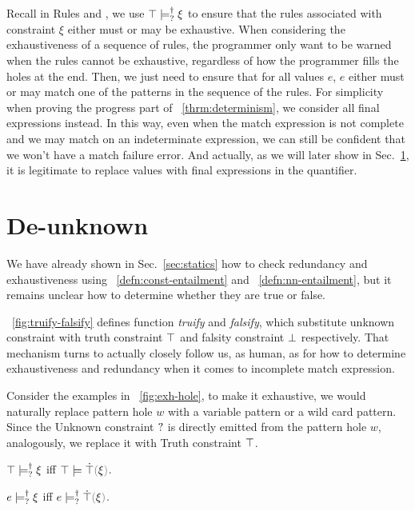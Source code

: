 \documentclass[runningheads,envcountsame,a4paper]{llncs}
\begin{document}
Recall in Rules \TMatchZPre and \TMatchNZPre, we use $\top \models_{?}^{\dag} \xi$ to ensure that the rules associated with constraint $\xi$ either must or may be exhaustive. When considering the exhaustiveness of a sequence of rules, the programmer only want to be warned when the rules cannot be exhaustive, regardless of how the programmer fills the holes at the end. Then, we just need to ensure that for all values $e$, $e$ either must or may match one of the patterns in the sequence of the rules. For simplicity when proving the progress part of  \theoremname~\ref{thrm:determinism}, we consider all final expressions instead. In this way, even when the match expression is not complete and we may match on an indeterminate expression, we can still be confident that we won't have a match failure error. And actually, as we will later show in Sec.~\ref{sec:algorithm}, it is legitimate to replace values with final expressions in the quantifier.

\section{De-unknown}\label{sec:algorithm}

We have already shown in Sec.~\ref{sec:statics} how to check redundancy and
exhaustiveness using ~\ref{defn:const-entailment} and
~\ref{defn:nn-entailment}, but it remains unclear how to
determine whether they are true or false.



\figurename~\ref{fig:truify-falsify} defines function \textit{truify} and \textit{falsify},
which substitute unknown constraint with truth constraint $\top$ and falsity
constraint $\bot$ respectively. That mechanism turns to actually closely follow us, as human, as for how to determine exhaustiveness and redundancy when it comes to incomplete match expression.

Consider the examples in \figurename~\ref{fig:exh-hole}, to make it exhaustive, we would naturally replace pattern hole $w$ with a variable pattern or a wild card pattern. Since the Unknown constraint $\mathtt{?}$ is directly emitted from the pattern hole $w$, analogously, we replace it with Truth constraint $\top$.
\begin{theorem}
  $\top \models_{?}^{\dag} \xi$ iff $\csatisfy{\ctruth}{\ctruify{\xi}}$.
\end{theorem}

\begin{lemma}
  $e \models_{?}^{\dag} \xi$ iff $\csatisfyormay{e}{\ctruify{\xi}}$.
\end{lemma}
\end{document}
